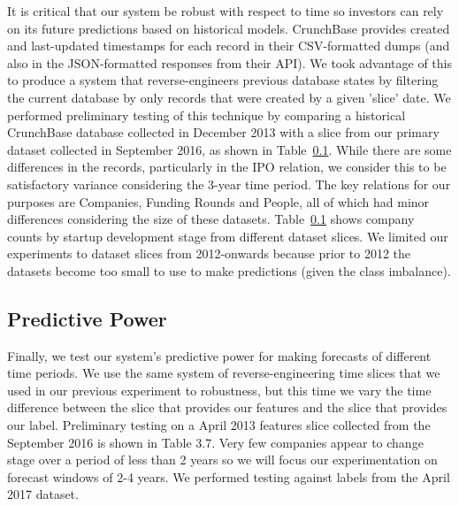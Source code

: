 \documentclass[../thesis/thesis.tex]{subfiles}
\begin{document}
It is critical that our system be robust with respect to time so investors can rely on its future predictions based on historical models. CrunchBase provides created and last-updated timestamps for each record in their CSV-formatted dumps (and also in the JSON-formatted responses from their API). We took advantage of this to produce a system that  reverse-engineers previous database states by filtering the current database by only records that were created by a given 'slice' date. We performed preliminary testing of this technique by comparing a historical CrunchBase database collected in December 2013 with a slice from our primary dataset collected in September 2016, as shown in Table~\ref{}. While there are some differences in the records, particularly in the IPO relation, we consider this to be satisfactory variance considering the 3-year time period. The key relations for our purposes are Companies, Funding Rounds and People, all of which had minor differences considering the size of these datasets. Table~\ref{} shows company counts by startup development stage from different dataset slices. We limited our experiments to dataset slices from 2012-onwards because prior to 2012 the datasets become too small to use to make predictions (given the class imbalance).




\subsection{Predictive Power}

Finally, we test our system's predictive power for making forecasts of different time periods. We use the same system of reverse-engineering time slices that we used in our previous experiment to robustness, but this time we vary the time difference between the slice that provides our features and the slice that provides our label. Preliminary testing on a April 2013 features slice collected from the September 2016 is shown in Table 3.7. Very few companies appear to change stage over a period of less than 2 years so we will focus our experimentation on forecast windows of 2-4 years. We performed testing against labels from the April 2017 dataset.




\end{document}
